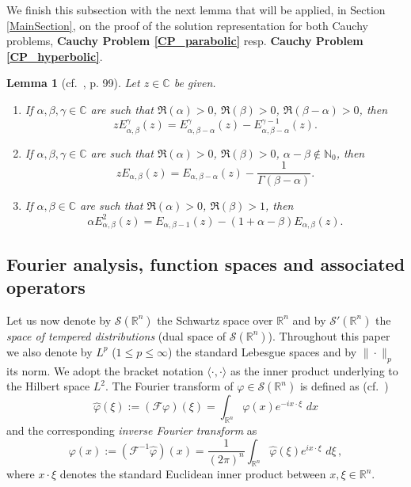 \documentclass{amsart}
\newtheorem{lemma}[theorem]{Lemma}
\theoremstyle{definition}
\theoremstyle{remark}
\numberwithin{equation}{section}
\newcommand{\BR}{{\mathbb R}}
\newcommand{\BC}{{\mathbb C}}
\newcommand{\BN}{{\mathbb N}}
\begin{document}
We finish this subsection with the next lemma that will be applied, in Section \ref{MainSection}, on the proof of the solution representation for both Cauchy problems, {\bf Cauchy Problem \ref{CP_parabolic}} resp. {\bf Cauchy Problem \ref{CP_hyperbolic}}. 
\newpage 
\begin{lemma}[cf.~\cite{GKMaiR14}, p. 99]
	\label{Properties_ML}
	Let $z\in \mathbb{C}$ be given.
	\begin{enumerate}
		\item[\bf (i)]
		If $\alpha,\beta,\gamma \in \BC$ are such that $\Re(\alpha)>0$, $\Re(\beta)>0$, $\Re(\beta-\alpha)>0$, then
		$$
		\displaystyle{zE_{\alpha,\beta}^\gamma(z)=E_{\alpha,\beta-\alpha}^\gamma(z)-E_{\alpha,\beta-\alpha}^{\gamma-1}(z)}.
		$$
		\item[\bf (ii)] If $\alpha,\beta,\gamma \in \BC$ are such that $\Re(\alpha)>0$, $\Re(\beta)>0$, $\alpha-\beta\notin \BN_0$, then
		$$
		\displaystyle{zE_{\alpha,\beta}(z)=E_{\alpha,\beta-\alpha}(z)-\frac{1}{\Gamma(\beta-\alpha)}}.
		$$
		\item[\bf (iii)] If $\alpha,\beta \in \BC$ are such that $\Re(\alpha)>0$, $\Re(\beta)>1$, then
		$$
		\displaystyle{ \alpha E_{\alpha,\beta}^2(z)=E_{\alpha,\beta-1}(z)-(1+\alpha-\beta)E_{\alpha,\beta}(z)}.
		$$
	\end{enumerate}
\end{lemma}


\subsection{Fourier analysis, function spaces and associated operators}\label{FourierAnalysisSetup}

Let us now denote by $\mathcal{S}(\BR^n)$ the Schwartz space over $\BR^n$ and by $\mathcal{S}'(\BR^n)$ the \textit{space of tempered distributions} (dual space of $\mathcal{S}(\BR^n)$). 
Throughout this paper we also denote by $L^p$ ($1\leq p\leq \infty$) the standard Lebesgue spaces and by $\|\cdot\|_p$ its norm. We adopt the bracket notation $\langle \cdot,\cdot \rangle$ as the inner product underlying to the Hilbert space $L^2$.
The Fourier transform of $\varphi\in \mathcal{S}(\BR^n)$ is defined as (cf.~\cite[Chapter A]{Tao06})
\begin{equation}
	\label{FT} \widehat{\varphi}(\xi):=(\mathcal{F} \varphi)(\xi)=
	\int_{\BR^n} \varphi(x)e^{-ix \cdot \xi}  \, \, dx
\end{equation}
and the corresponding {\it inverse Fourier transform} as
\begin{equation}
	\label{FInv} \varphi(x):=(\mathcal{F}^{-1}\widehat{\varphi})(x)=\frac{1}{(2\pi)^{n}}
	\int_{\BR^n} \widehat{\varphi}(\xi)e^{ix \cdot \xi}  \, \, d\xi \, ,
\end{equation}
where $x\cdot \xi $ denotes the standard Euclidean inner product between $x,\xi\in \BR^n$.
\end{document}
